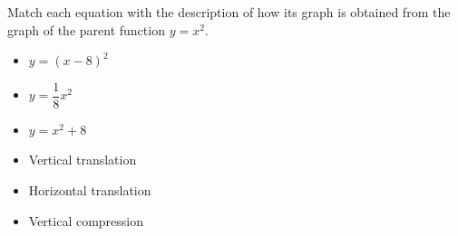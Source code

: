 Match each equation with the description of how its graph is obtained from the graph of the parent function $y=x^2$.
\begin{itemize}
\item[x.] $y=(x-8)^2$
\item[y.] $y=\dfrac{1}{8}x^2$
\item[z.] $y=x^2+8$
\end{itemize}
\begin{itemize}
\item[1.] Vertical translation
\item[2.] Horizontal translation
\item[3.] Vertical compression
\end{itemize}
